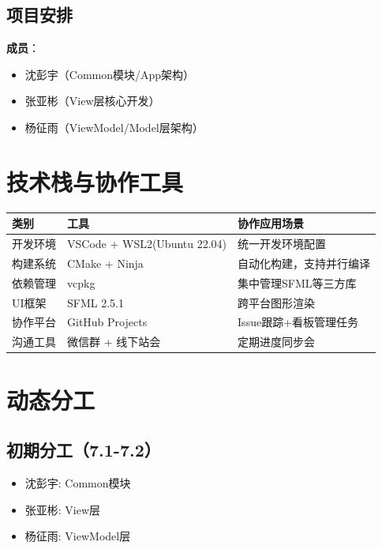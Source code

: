 \documentclass{article}
\begin{document}
\subsection{项目安排}
\textbf{成员}：
\begin{itemize}
    \item 沈彭宇（Common模块/App架构）
    \item 张亚彬（View层核心开发）
    \item 杨征雨（ViewModel/Model层架构）
\end{itemize}


\section{技术栈与协作工具}
\begin{tabular}{lll}
\toprule
类别 & 工具 & 协作应用场景 \\
\midrule
开发环境 & VSCode + WSL2(Ubuntu 22.04) & 统一开发环境配置 \\
构建系统 & CMake + Ninja & 自动化构建，支持并行编译 \\
依赖管理 & vcpkg & 集中管理SFML等三方库 \\
UI框架 & SFML 2.5.1 & 跨平台图形渲染 \\
协作平台 & GitHub Projects & Issue跟踪+看板管理任务 \\
沟通工具 & 微信群 + 线下站会 & 定期进度同步会 \\
\bottomrule
\end{tabular}

\section{动态分工}

\subsection{初期分工（7.1-7.2）}
\begin{itemize}
    \item 沈彭宇: Common模块
    \item 张亚彬: View层
    \item 杨征雨: ViewModel层
\end{itemize}
\end{document}
